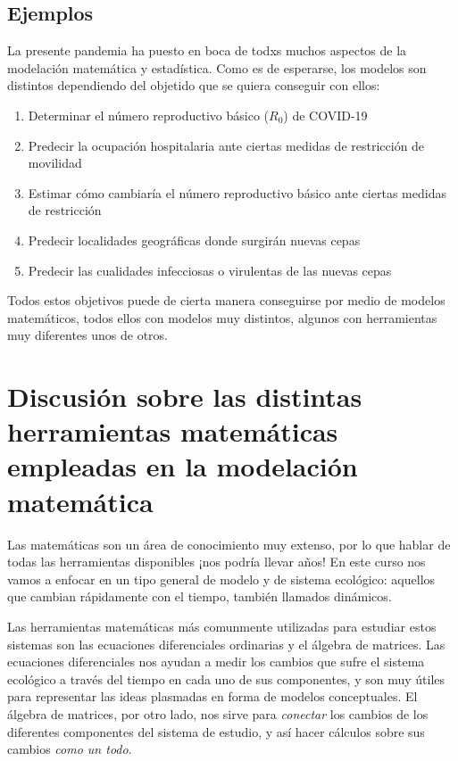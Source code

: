 \documentclass[
]{book}
\providecommand{\tightlist}{%
  \setlength{\itemsep}{0pt}\setlength{\parskip}{0pt}}
\begin{document}
\hypertarget{ejemplos}{%
\subsection{Ejemplos}\label{ejemplos}}

La presente pandemia ha puesto en boca de todxs muchos aspectos de la modelación matemática y estadística. Como es de esperarse, los modelos son distintos dependiendo del objetido que se quiera conseguir con ellos:

\begin{enumerate}
\def\labelenumi{\arabic{enumi}.}
\tightlist
\item
  Determinar el número reproductivo básico (\(R_0\)) de COVID-19
\item
  Predecir la ocupación hospitalaria ante ciertas medidas de restricción de movilidad
\item
  Estimar cómo cambiaría el número reproductivo básico ante ciertas medidas de restricción
\item
  Predecir localidades geográficas donde surgirán nuevas cepas
\item
  Predecir las cualidades infecciosas o virulentas de las nuevas cepas
\end{enumerate}

Todos estos objetivos puede de cierta manera conseguirse por medio de modelos matemáticos, todos ellos con modelos muy distintos, algunos con herramientas muy diferentes unos de otros.

\hypertarget{discusiuxf3n-sobre-las-distintas-herramientas-matemuxe1ticas-empleadas-en-la-modelaciuxf3n-matemuxe1tica}{%
\section{Discusión sobre las distintas herramientas matemáticas empleadas en la modelación matemática}\label{discusiuxf3n-sobre-las-distintas-herramientas-matemuxe1ticas-empleadas-en-la-modelaciuxf3n-matemuxe1tica}}

Las matemáticas son un área de conocimiento muy extenso, por lo que hablar de todas las herramientas disponibles ¡nos podría llevar años! En este curso nos vamos a enfocar en un tipo general de modelo y de sistema ecológico: aquellos que cambian rápidamente con el tiempo, también llamados dinámicos.

Las herramientas matemáticas más comunmente utilizadas para estudiar estos sistemas son las ecuaciones diferenciales ordinarias y el álgebra de matrices. Las ecuaciones diferenciales nos ayudan a medir los cambios que sufre el sistema ecológico a través del tiempo en cada uno de sus componentes, y son muy útiles para representar las ideas plasmadas en forma de modelos conceptuales. El álgebra de matrices, por otro lado, nos sirve para \emph{conectar} los cambios de los diferentes componentes del sistema de estudio, y así hacer cálculos sobre sus cambios \emph{como un todo}.
\end{document}
